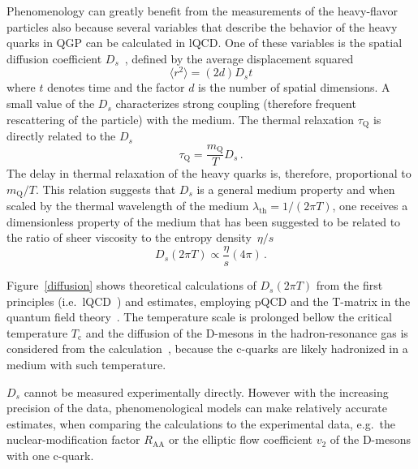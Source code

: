 Phenomenology can greatly benefit from the measurements of the heavy-flavor particles also because several variables that describe the behavior of the heavy quarks in QGP can be calculated in lQCD\@.  One of these variables is the spatial diffusion coefficient $D_s$~\cite{BanerjeeLattice,DingLattice}, defined by the average displacement squared
\begin{equation}
 \langle r^2 \rangle = (2d) D_s t
\end{equation}
where $t$ denotes time and the factor $d$ is the number of spatial dimensions. A small value of the $D_s$ characterizes strong coupling (therefore frequent rescattering of the particle) with the medium. The thermal relaxation $\tau_\mathrm{Q}$ is directly related to the $D_s$~\cite{Prino_Rapp_HF}
\begin{equation}
 \tau_\mathrm{Q} = \frac{m_\mathrm{Q}}{T} D_s\,.
\end{equation}
The delay in thermal relaxation of the heavy quarks is, therefore, proportional to $m_\mathrm{Q}/T$\@. This relation suggests that $D_s$ is a general medium property and when scaled by the thermal wavelength of the medium $\lambda_\mathrm{th} = 1/(2 \pi T)$, one receives a dimensionless property of the medium that has been suggested to be related to the ratio of sheer viscosity to the entropy density~$\eta/s$~\cite{heavyThermalizationAndEtaOverS,QGP4}
\begin{equation}
D_s(2\pi T) \propto \frac{\eta}{s} (4\pi)\,.
\end{equation}

Figure~\ref{diffusion} shows theoretical calculations of $D_s(2\pi T)$ from the first principles (i.e.\ lQCD~\cite{BanerjeeLattice,DingLattice}) and estimates, employing pQCD and the T-matrix in the quantum field theory~\cite{Tmatrix}\@. The temperature scale is prolonged bellow the critical temperature $T_\mathrm{c}$ and the diffusion of the D-mesons in the hadron-resonance gas is considered from the calculation~\cite{DmesonHRG}, because the c-quarks are likely hadronized in a medium with such temperature.

$D_s$ cannot be  measured experimentally directly. However with the increasing precision of the data, phenomenological models can make relatively accurate estimates, when comparing the calculations to the experimental data, e.g.\ the nuclear-modification factor $R_\mathrm{AA}$ or the elliptic flow coefficient $v_2$ of the D-mesons with one c-quark\@.


